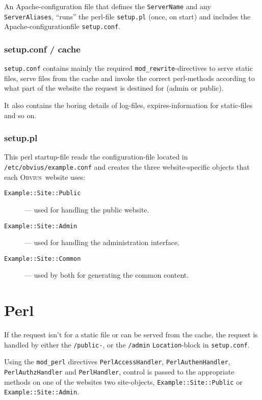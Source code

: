 \documentclass[a4paper,12pt]{article}
\newcommand{\obvius}{\textsc{Obvius}}
\newcommand{\modperl}{\texttt{mod\_perl}}
\newcommand{\modrewrite}{\texttt{mod\_rewrite}}
\begin{document}
An Apache-configuration file that defines the \texttt{ServerName} and
any \texttt{ServerAliases}, ``runs'' the perl-file \texttt{setup.pl}
(once, on start) and includes the Apache-configurationfile
\texttt{setup.conf}.

\subsubsection{setup.conf / cache}

\texttt{setup.conf} contains mainly the required
\modrewrite-directives to serve static files, serve files from the
cache and invoke the correct perl-methods according to what part of
the website the request is destined for (admin or public).

It also contains the boring details of log-files, expires-information
for static-files and so on.

\subsubsection{setup.pl}

This perl startup-file reads the configuration-file located in
\texttt{/etc/obvius/example.conf} and creates the three
website-specific objects that each \obvius\ website uses:

\begin{description}
\item[\texttt{Example::Site::Public}] --- used for handling the public website.
\item[\texttt{Example::Site::Admin}]  --- used for handling the administration interface.
\item[\texttt{Example::Site::Common}] --- used by both for generating the common
  content.
\end{description}


\section{Perl}

If the request isn't for a static file or can be served from the
cache, the request is handled by either the \texttt{/public-}, or the
\texttt{/admin} \texttt{Location}-block in \texttt{setup.conf}.

Using the {\modperl} directives \texttt{PerlAccessHandler},
\texttt{PerlAuthenHandler}, \texttt{PerlAuthzHandler} and
\texttt{PerlHandler}, control is passed to the appropriate methods on
one of the websites two site-objects, \texttt{Example::Site::Public}
or \texttt{Example::Site::Admin}.
\end{document}
